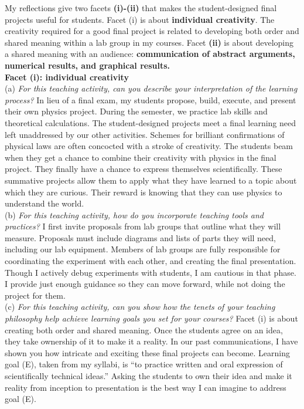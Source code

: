 \documentclass[../../../main.tex]{subfiles}
\begin{document}
My reflections give two facets \textbf{(i)-(ii)} that makes the student-designed final projects useful for students.  Facet (i) is about \textbf{individual creativity}.  The creativity required for a good final project is related to developing both order and shared meaning within a lab group in my courses.  Facet \textbf{(ii)} is about developing a shared meaning with an audience: \textbf{communication of abstract arguments, numerical results, and graphical results.}
\\
\vspace{0.25cm}
\textbf{Facet (i): individual creativity}
\\
\vspace{0.25cm}
(a) \textit{For this teaching activity, can you describe your interpretation of the learning process?} In lieu of a final exam, my students propose, build, execute, and present their own physics project.  During the semester, we practice lab skills and theoretical calculations.  The student-designed projects meet a final learning need left unaddressed by our other activities.  Schemes for brilliant confirmations of physical laws are often concocted with a stroke of creativity.  The students beam when they get a chance to combine their creativity with physics in the final project.  They finally have a chance to express themselves scientifically.  These summative projects allow them to apply what they have learned to a topic about which they are curious.  Their reward is knowing that they can use physics to understand the world. 
\\
\vspace{0.25cm}
(b) \textit{For this teaching activity, how do you incorporate teaching tools and practices?}  I first invite proposals from lab groups that outline what they will measure.  Proposals must include diagrams and lists of parts they will need, including our lab equipment.  Members of lab groups are fully responsible for coordinating the experiment with each other, and creating the final presentation.  Though I actively debug experiments with students, I am cautious in that phase. I provide just enough guidance so they can move forward, while not doing the project for them.
\\
\vspace{0.25cm}
(c) \textit{For this teaching activity, can you show how the tenets of your teaching philosophy help achieve learning goals you set for your courses?} Facet (i) is about creating both order and shared meaning.  Once the students agree on an idea, they take ownership of it to make it a reality.  In our past communications, I have shown you how intricate and exciting these final projects can become.  Learning goal (E), taken from my syllabi, is ``to practice written and oral expression of scientifically technical ideas.''  Asking the students to own their idea and make it reality from inception to presentation is the best way I can imagine to address goal (E).
\end{document}
